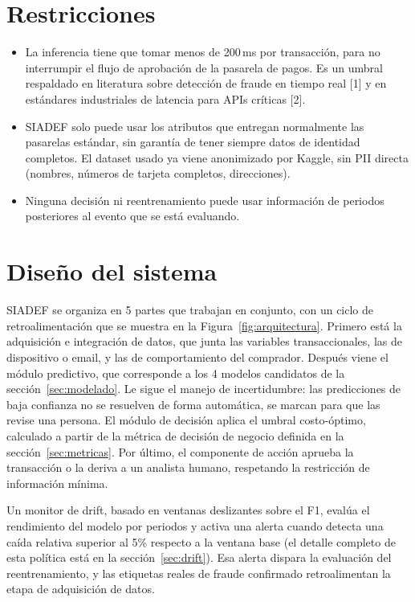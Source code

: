 \documentclass[10pt]{article}
\begin{document}
\section{Restricciones}
\begin{itemize}
  \item La inferencia tiene que tomar menos de 200\,ms por transacción, para no interrumpir el flujo de aprobación de la pasarela de pagos. Es un umbral respaldado en literatura sobre detección de fraude en tiempo real [1] y en estándares industriales de latencia para APIs críticas [2].
  \item SIADEF solo puede usar los atributos que entregan normalmente las pasarelas estándar, sin garantía de tener siempre datos de identidad completos. El dataset usado ya viene anonimizado por Kaggle, sin PII directa (nombres, números de tarjeta completos, direcciones).
  \item Ninguna decisión ni reentrenamiento puede usar información de periodos posteriores al evento que se está evaluando.
\end{itemize}

\section{Diseño del sistema}
\label{sec:diseno}
SIADEF se organiza en 5 partes que trabajan en conjunto, con un ciclo de retroalimentación que se muestra en la Figura~\ref{fig:arquitectura}. Primero está la adquisición e integración de datos, que junta las variables transaccionales, las de dispositivo o email, y las de comportamiento del comprador. Después viene el módulo predictivo, que corresponde a los 4 modelos candidatos de la sección~\ref{sec:modelado}. Le sigue el manejo de incertidumbre: las predicciones de baja confianza no se resuelven de forma automática, se marcan para que las revise una persona. El módulo de decisión aplica el umbral costo-óptimo, calculado a partir de la métrica de decisión de negocio definida en la sección~\ref{sec:metricas}. Por último, el componente de acción aprueba la transacción o la deriva a un analista humano, respetando la restricción de información mínima.

Un monitor de drift, basado en ventanas deslizantes sobre el F1, evalúa el rendimiento del modelo por periodos y activa una alerta cuando detecta una caída relativa superior al 5\% respecto a la ventana base (el detalle completo de esta política está en la sección~\ref{sec:drift}). Esa alerta dispara la evaluación del reentrenamiento, y las etiquetas reales de fraude confirmado retroalimentan la etapa de adquisición de datos.
\end{document}

